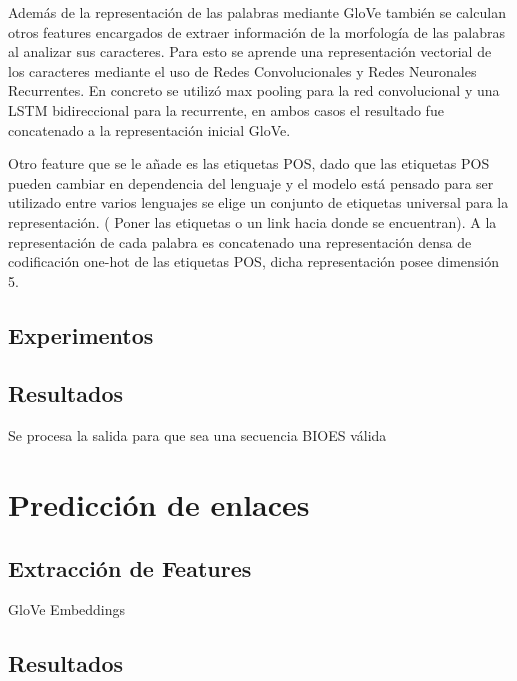 Además de la representación de las palabras mediante GloVe también se calculan otros features
encargados de extraer información de la morfología de las palabras al analizar sus caracteres.
Para esto se aprende una representación vectorial de los caracteres mediante el uso de Redes Convolucionales
y Redes Neuronales Recurrentes. En concreto se utilizó max pooling para la red convolucional
y una LSTM bidireccional para la recurrente, en ambos casos el resultado fue concatenado
a la representación inicial GloVe.

Otro feature que se le añade es las etiquetas POS, dado que las etiquetas POS pueden
cambiar en dependencia del lenguaje y el modelo está pensado para ser utilizado entre
varios lenguajes se elige un conjunto de etiquetas universal para la representación.
( Poner las etiquetas o un link hacia donde se encuentran). A la representación
de cada palabra es concatenado una representación densa de codificación one-hot de las 
etiquetas POS, dicha representación posee dimensión 5.

\subsection{Experimentos}



\subsection{Resultados}

Se procesa la salida para que sea una secuencia BIOES válida

\section{Predicción de enlaces}

\subsection{Extracción de Features}

GloVe Embeddings

\subsection{Resultados}
